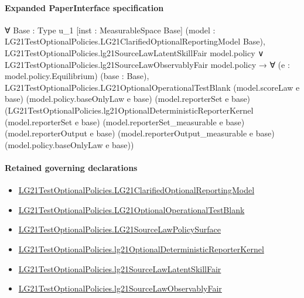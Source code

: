 \documentclass[10pt]{article}
\begin{document}
\paragraph{Expanded PaperInterface specification}
\begin{ReviewVerbatim}
∀ {Base : Type u_1} [inst : MeasurableSpace Base]
  (model : LG21TestOptionalPolicies.LG21ClarifiedOptionalReportingModel Base),
  LG21TestOptionalPolicies.lg21SourceLawLatentSkillFair model.policy ∨
      LG21TestOptionalPolicies.lg21SourceLawObservablyFair model.policy →
    ∀ (e : model.policy.Equilibrium) (base : Base),
      LG21TestOptionalPolicies.LG21OptionalOperationalTestBlank (model.scoreLaw e base)
        (model.policy.baseOnlyLaw e base) (model.reporterSet e base)
        (LG21TestOptionalPolicies.lg21OptionalDeterministicReporterKernel (model.reporterSet e base)
          (model.reporterSet_measurable e base) (model.reporterOutput e base) (model.reporterOutput_measurable e base)
          (model.policy.baseOnlyLaw e base))
\end{ReviewVerbatim}

\paragraph{Retained governing declarations}
\begin{itemize}\raggedright
\item \hyperlink{governing-declaration-2b174af5c6fd50a6}{LG21\allowbreak{}Test\allowbreak{}Optional\allowbreak{}Policies.\allowbreak{}LG21\allowbreak{}Clarified\allowbreak{}Optional\allowbreak{}Reporting\allowbreak{}Model}
\item \hyperlink{governing-declaration-e7b17ecf1edeb27a}{LG21\allowbreak{}Test\allowbreak{}Optional\allowbreak{}Policies.\allowbreak{}LG21\allowbreak{}Optional\allowbreak{}Operational\allowbreak{}Test\allowbreak{}Blank}
\item \hyperlink{governing-declaration-48965123e52b8b0f}{LG21\allowbreak{}Test\allowbreak{}Optional\allowbreak{}Policies.\allowbreak{}LG21\allowbreak{}Source\allowbreak{}Law\allowbreak{}Policy\allowbreak{}Surface}
\item \hyperlink{governing-declaration-1d22dcbaf5c495df}{LG21\allowbreak{}Test\allowbreak{}Optional\allowbreak{}Policies.\allowbreak{}lg21\allowbreak{}Optional\allowbreak{}Deterministic\allowbreak{}Reporter\allowbreak{}Kernel}
\item \hyperlink{paper-prerequisite-29470906bfc1caef}{LG21\allowbreak{}Test\allowbreak{}Optional\allowbreak{}Policies.\allowbreak{}lg21\allowbreak{}Source\allowbreak{}Law\allowbreak{}Latent\allowbreak{}Skill\allowbreak{}Fair}
\item \hyperlink{paper-prerequisite-a01f7afb43c09d7e}{LG21\allowbreak{}Test\allowbreak{}Optional\allowbreak{}Policies.\allowbreak{}lg21\allowbreak{}Source\allowbreak{}Law\allowbreak{}Observably\allowbreak{}Fair}
\end{itemize}
\end{document}

